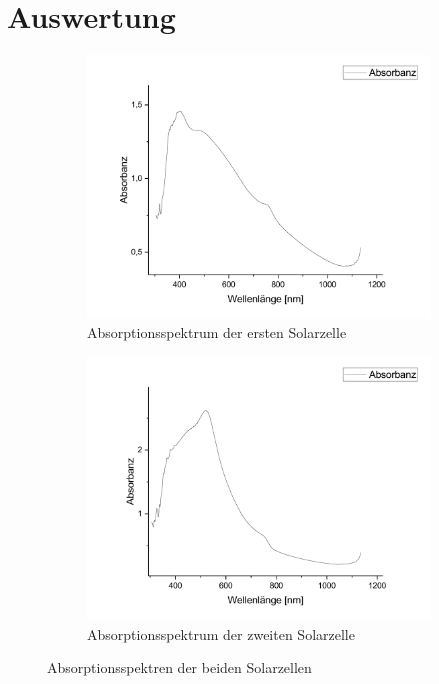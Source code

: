 \documentclass[12pt,a4paper,ngerman]{report}
\begin{document}
		

\chapter{Auswertung}
	\begin{figure}[ht]
		\centering
		\begin{subfigure}[b]{0.45\textwidth}
			\centering
			\includegraphics[width=\textwidth]{bilder/AbsP1.pdf}
			\caption{Absorptionsspektrum der ersten Solarzelle}
			\label{fig:AbsP1}
		\end{subfigure}
		\hfill
		\begin{subfigure}[b]{0.45\textwidth}
			\centering
			\includegraphics[width=\textwidth]{bilder/AbsP2.pdf}
			\caption{Absorptionsspektrum der zweiten Solarzelle}
			\label{fig:AbsP2}
		\end{subfigure}
		\caption{Absorptionsspektren der beiden Solarzellen}
		\label{fig:AbsP1P2Combined}
	\end{figure}
\end{document}
